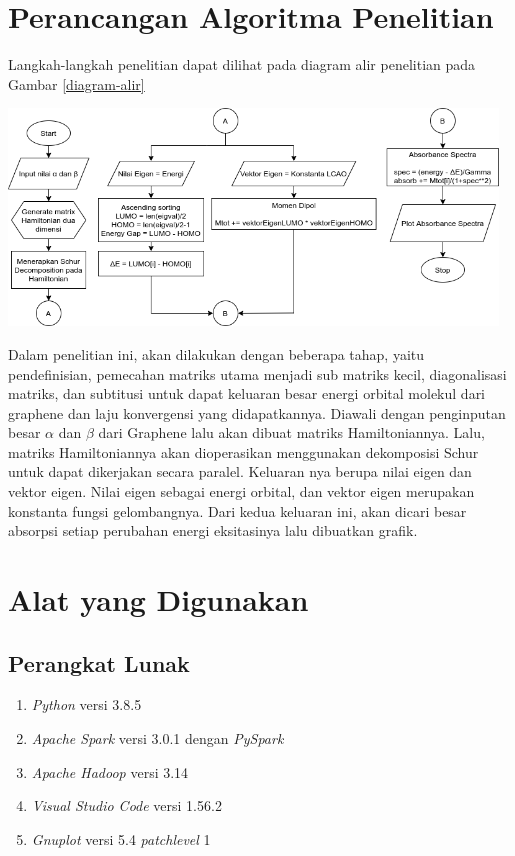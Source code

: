\documentclass[12pt,a4paper]{report}
\begin{document}
	\section{Perancangan Algoritma Penelitian}
	
	Langkah-langkah penelitian dapat dilihat pada diagram alir penelitian pada Gambar \ref{diagram-alir} 
	\begin{center}
		\includegraphics[width=13cm]{gambar/diagram.png}
		\label{diagram-alir}
	\end{center}
	 
	 Dalam penelitian ini, akan dilakukan dengan beberapa tahap, yaitu pendefinisian, pemecahan matriks utama menjadi sub matriks kecil, diagonalisasi matriks, dan subtitusi untuk dapat keluaran besar energi orbital molekul dari graphene dan laju konvergensi yang didapatkannya. Diawali dengan penginputan besar {$\alpha$} dan {$\beta$} dari Graphene lalu akan dibuat matriks Hamiltoniannya. Lalu, matriks Hamiltoniannya akan dioperasikan menggunakan dekomposisi Schur untuk dapat dikerjakan secara paralel. Keluaran nya berupa nilai eigen dan vektor eigen. Nilai eigen sebagai energi orbital, dan vektor eigen merupakan konstanta fungsi gelombangnya. Dari kedua keluaran ini, akan dicari besar absorpsi setiap perubahan energi eksitasinya lalu dibuatkan grafik.
	 
	\section{Alat yang Digunakan}
			\subsection{Perangkat Lunak}
			\begin{enumerate}
				\vspace{-0.2cm} \item \textit{Python} versi 3.8.5 
				\vspace{-0.8cm} \item \textit{Apache Spark} versi 3.0.1 dengan \textit{PySpark}
				\vspace{-0.8cm} \item \textit{Apache Hadoop} versi 3.14
				\vspace{-0.8cm} \item \textit{Visual Studio Code} versi 1.56.2
				\vspace{-0.8cm} \item \textit{Gnuplot} versi 5.4 \textit{patchlevel} 1
			\end{enumerate}
		
\end{document}

